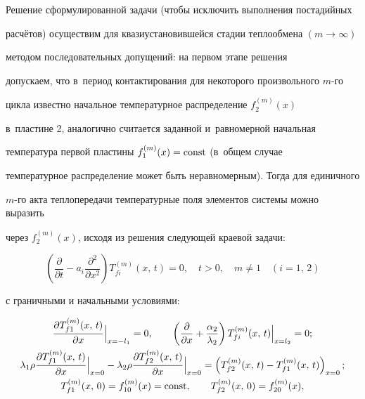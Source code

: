 Решение сформулированной задачи (чтобы исключить выполнения постадийных 

расчётов) осуществим для квазиустановившейся стадии теплообмена $(m\to \infty )$ 

методом последовательных допущений: на первом этапе решения 

допускаем, что в~период контактирования для некоторого произвольного $m$-го 

цикла известно начальное температурное распределение $f_2^{(m)} (x)$ 

в~пластине 2, аналогично считается заданной и~равномерной начальная 

температура первой пластины $f_1^{(m)} (x) = \rm const$ (в~общем случае 

температурное распределение может быть неравномерным). Тогда для единичного 

$m$-го акта теплопередачи температурные поля элементов системы можно выразить 

через $f_2^{(m)} (x)$, исходя из решения следующей краевой задачи:

\begin{equation}

\label{evdok:eq5}

\left( {\frac{\partial }{\partial t} - a_i \frac{\partial ^2}{\partial x^2}} 

\right)T_{fi}^{(m)} (x,\,t) = 0,\quad t > 0,\quad m \ne 1\quad  (i = 1,\,2) 

\end{equation}

с граничными и начальными условиями: 

\begin{gather}

\frac{\partial T_{f1}^{(m)} (x,\,t)}{\partial x}\Big|_{x = - l_1 } = 0, 

\qquad

\left( {\frac{\partial }{\partial x} + \frac{\alpha _2 }{\lambda _2 }} 

\right)T_{fi}^{(m)} (x,\,t)\Big|_{x = l_2 } = 0;\\

\label{evdok:eq6}

\lambda _1 \rho \frac{\partial T_{f1}^{(m)} (x,\,t)}{\partial x}\Big|_{x = 0 } -

\lambda _2 \rho \frac{\partial T_{f2}^{(m)} (x,\,t)}{\partial x}\Big|_{x = 0 }  = \left(

T_{f2}^{(m)} (x,\,t) - T_{f1}^{(m)} (x,\,t)\right)_{x=0};\\

\label{evdok:eq7}

T_{f1}^{(m)} (x,\,0) = f_{10}^{(m)} (x) = {\rm  const},\qquad T_{f2}^{(m)} (x,\,0) = f_{20}^{(m)} (x),

\end{gather}

